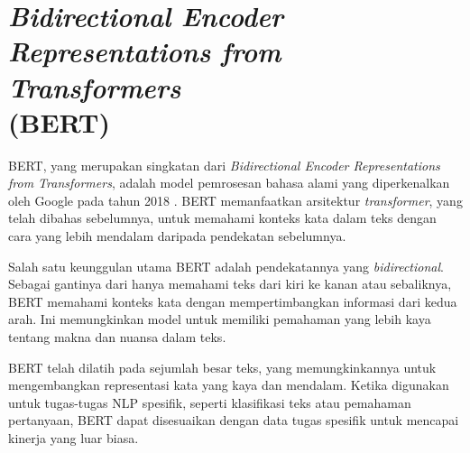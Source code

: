\section{\textit{Bidirectional Encoder Representations from Transformers} \\ (BERT)}

BERT, yang merupakan singkatan dari \textit{Bidirectional Encoder Representations from Transformers}, adalah model pemrosesan bahasa alami yang diperkenalkan oleh Google pada tahun 2018 \parencite{bert}. BERT memanfaatkan arsitektur \textit{transformer}, yang telah dibahas sebelumnya, untuk memahami konteks kata dalam teks dengan cara yang lebih mendalam daripada pendekatan sebelumnya.

Salah satu keunggulan utama BERT adalah pendekatannya yang \textit{bidirectional}. Sebagai gantinya dari hanya memahami teks dari kiri ke kanan atau sebaliknya, BERT memahami konteks kata dengan mempertimbangkan informasi dari kedua arah. Ini memungkinkan model untuk memiliki pemahaman yang lebih kaya tentang makna dan nuansa dalam teks.

BERT telah dilatih pada sejumlah besar teks, yang memungkinkannya untuk mengembangkan representasi kata yang kaya dan mendalam. Ketika digunakan untuk tugas-tugas NLP spesifik, seperti klasifikasi teks atau pemahaman pertanyaan, BERT dapat disesuaikan dengan data tugas spesifik untuk mencapai kinerja yang luar biasa.

